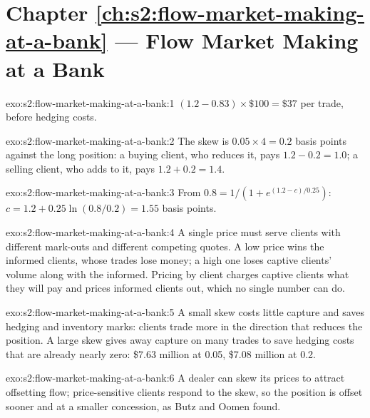 \section*{Chapter \ref{ch:s2:flow-market-making-at-a-bank} --- Flow Market Making at a Bank}

\begin{solution}{exo:s2:flow-market-making-at-a-bank:1}
$(1.2 - 0.83) \times \$100 = \$37$ per trade, before hedging costs.
\end{solution}

\begin{solution}{exo:s2:flow-market-making-at-a-bank:2}
The skew is $0.05 \times 4 = 0.2$ basis points against the long position: a buying client, who reduces it, pays $1.2 - 0.2 = 1.0$; a selling client,
who adds to it, pays $1.2 + 0.2 = 1.4$.
\end{solution}

\begin{solution}{exo:s2:flow-market-making-at-a-bank:3}
From $0.8 = 1/(1 + e^{(1.2 - c)/0.25})$: $c = 1.2 + 0.25 \ln(0.8/0.2) = 1.55$ basis points.
\end{solution}

\begin{solution}{exo:s2:flow-market-making-at-a-bank:4}
A single price must serve clients with different mark-outs and different competing quotes. A low price wins the informed clients, whose trades lose
money; a high one loses captive clients' volume along with the informed. Pricing by client charges captive clients what they will pay and prices
informed clients out, which no single number can do.
\end{solution}

\begin{solution}{exo:s2:flow-market-making-at-a-bank:5}
A small skew costs little capture and saves hedging and inventory marks: clients trade more in the direction that reduces the position. A large skew
gives away capture on many trades to save hedging costs that are already nearly zero: \$7.63 million at 0.05, \$7.08 million at 0.2.
\end{solution}

\begin{solution}{exo:s2:flow-market-making-at-a-bank:6}
A dealer can skew its prices to attract offsetting flow; price-sensitive clients respond to the skew, so the position is offset sooner and at a smaller
concession, as Butz and Oomen found.
\end{solution}

